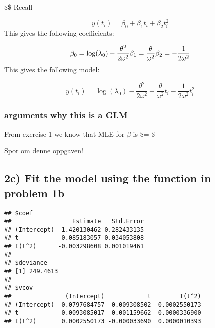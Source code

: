 \documentclass[
]{article}
\newenvironment{Shaded}{\begin{snugshade}}{\end{snugshade}}
\newcommand{\CommentTok}[1]{\textcolor[rgb]{0.56,0.35,0.01}{\textit{#1}}}
\newcommand{\DecValTok}[1]{\textcolor[rgb]{0.00,0.00,0.81}{#1}}
\newcommand{\KeywordTok}[1]{\textcolor[rgb]{0.13,0.29,0.53}{\textbf{#1}}}
\newcommand{\NormalTok}[1]{#1}
\newcommand{\OperatorTok}[1]{\textcolor[rgb]{0.81,0.36,0.00}{\textbf{#1}}}
\newcommand{\StringTok}[1]{\textcolor[rgb]{0.31,0.60,0.02}{#1}}
\begin{document}
\$\$ Recall

\[
y(t_i) = \beta_0 + \beta_1t_i + \beta_2 t_i^2
\] This gives the following coefficients:

\[
\beta_0 = \log(\lambda_0) -\frac{\theta^2}{2\omega^2}\\ 
\beta_1 = \frac{\theta}{\omega^2}\\ 
\beta_2 = -\frac{1}{2\omega^2}
\] This gives the following model:

\[
y(t_i) = \log(\lambda_0) -\frac{\theta^2}{2\omega^2} + \frac{\theta}{\omega^2}t_i -\frac{1}{2\omega^2} t_i^2
\]

\hypertarget{arguments-why-this-is-a-glm}{%
\subsubsection{arguments why this is a
GLM}\label{arguments-why-this-is-a-glm}}

From exercise 1 we know that MLE for \(\beta\) is \$\beta = \$

Spor om denne oppgaven!

\hypertarget{c-fit-the-model-using-the-function-in-problem-1b}{%
\subsection{2c) Fit the model using the function in problem
1b}\label{c-fit-the-model-using-the-function-in-problem-1b}}

\begin{Shaded}
\end{Shaded}

\begin{verbatim}
## $coef
##                 Estimate   Std.Error
## (Intercept)  1.420130462 0.282433135
## t            0.085183057 0.034053808
## I(t^2)      -0.003298608 0.001019461
## 
## $deviance
## [1] 249.4613
## 
## $vcov
##               (Intercept)            t        I(t^2)
## (Intercept)  0.0797684757 -0.009308502  0.0002550173
## t           -0.0093085017  0.001159662 -0.0000336900
## I(t^2)       0.0002550173 -0.000033690  0.0000010393
\end{verbatim}
\end{document}
